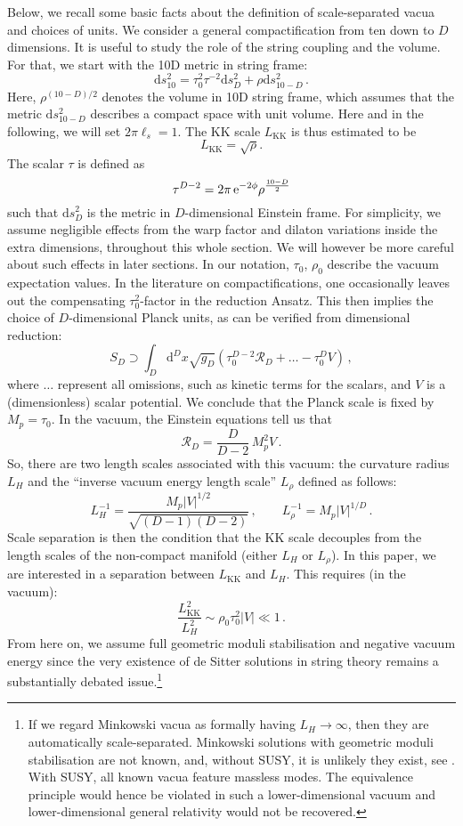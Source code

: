 \documentclass[11pt]{article}
\newcommand{\be}{\begin{equation}}
\newcommand{\ee}{\end{equation}}
\def\be{\begin{equation}}
\def\ee{\end{equation}}
\def\t{\tau}
\def\r{\rho}
\renewcommand{\[}{\left[}
\renewcommand{\]}{\right]}
\renewcommand{\(}{\left(}
\renewcommand{\)}{\right)}
\renewcommand{\d}{\textrm{d}}
\newcommand{\<}{\langle}
\renewcommand{\>}{\rangle}
\begin{document}
Below, we recall some basic facts about the definition of scale-separated vacua and choices of units. We consider a general compactification from ten down to $D$ dimensions. It is useful to study the role of the string coupling and the volume. For that, we start with the 10D metric in string frame:
\be\label{planck}
\d s^2_{10} = \t_0^2 \t^{-2} \d s_D^2 + \r \d s^2_{10-D} \, .  
\ee
Here, $\rho^{(10-D)/2}$ denotes the volume in 10D string frame, which assumes that the metric $\d s^2_{10-D}$ describes a compact space with unit volume. Here and in the following, we will set $2\pi\ell_s=1$. The KK scale $L_\text{KK}$ is thus estimated to be
\be
L_\text{KK} = \sqrt{\rho}. \label{defkk}
\ee
The scalar $\t$ is defined as 
\be
\label{dilatontr}
\t^{D-2} = 2\pi\,{\rm e}^{-2 \phi} \r^{\frac{10-D}{2}}
\ee
such that $\d s^2_{D}$ is the metric in $D$-dimensional Einstein frame. For simplicity, we assume negligible effects from the warp factor and dilaton variations inside the extra dimensions, throughout this whole section. We will however be more careful about such effects in later sections. In our notation, $\tau_0$, $\rho_0$ describe the vacuum expectation values. In the literature on compactifications, one occasionally leaves out the compensating $\t_0^{2}$-factor in the reduction Ansatz. This then implies the choice of $D$-dimensional Planck units, as  can be verified from dimensional reduction: \be
S_D \supset \int_D\d^D x\sqrt{g_D}\left(\t_0^{D-2}\mathcal{R}_D + \ldots - \t_0^{D}V\right)\,,
\ee
where $\ldots$ represent all omissions, such as kinetic terms for the scalars, and $V$ is a (dimensionless) scalar potential. We conclude that the Planck scale is fixed by $M_p = \t_0$. In the vacuum, the Einstein equations tell us that
\be
\mathcal{R}_D = \frac{D}{D-2}\, M_p^2 V\,.
\ee
So, there are two length scales associated with this vacuum: the curvature radius $L_{H}$ and the ``inverse vacuum energy length scale'' $L_{\rho}$ defined as follows: \be
L_{H}^{-1} = \frac{M_p |V|^{1/2}}{\sqrt{(D-1)(D-2)}}\,,\qquad L_{\rho}^{-1}= M_p |V|^{1/D} \,.
\ee
Scale separation is then the condition that the KK scale decouples from the length scales of the non-compact manifold (either $L_{H}$ or $L_{\rho}$). In this paper, we are interested in a separation between $L_\text{KK}$ and $L_{H}$. This requires (in the vacuum):
\be \label{scalesep}
\frac{L_\text{KK}^2}{L_{H}^2} \sim \rho_0\tau_0^2 |V|\ll 1\,.
\ee
From here on, we assume full geometric moduli stabilisation and negative vacuum energy since the very existence of de Sitter solutions in string theory remains a substantially debated issue.\footnote{If we regard Minkowski vacua as formally having $L_H \rightarrow \infty$, then they are automatically scale-separated. Minkowski solutions with geometric moduli stabilisation are not known, and, without SUSY, it is unlikely they exist, see \cite{Palti:2020qlc}. With SUSY, all known vacua feature massless modes. The equivalence principle would hence be violated in such a lower-dimensional vacuum and lower-dimensional general relativity would not be recovered.}
\end{document}
